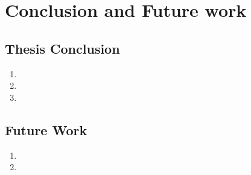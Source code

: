 \chapter{Conclusion and Future work}
\section{Thesis Conclusion}
\begin{enumerate}
\item \lipsum[1] 

\item \lipsum[1] 

\item \lipsum[1]   
 
\end{enumerate}


\section{Future Work}
\begin{enumerate}
\item \lipsum[1]   

\item \lipsum[1]   
\end{enumerate}  